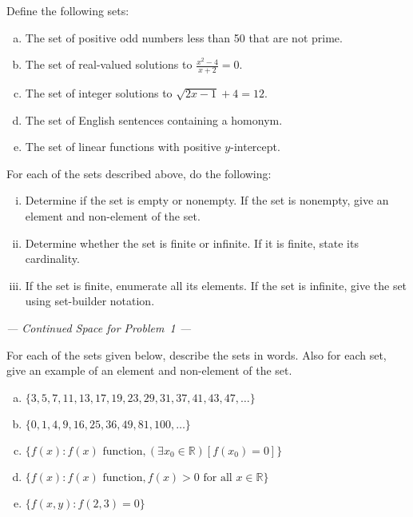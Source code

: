 \documentclass[11pt,letterpaper]{article}
\begin{document}

 Define the following sets:
        \begin{enumerate}[(a)]
        \item The set of positive odd numbers less than 50 that are not prime. 
        \item The set of real-valued solutions to $\frac{x^2 - 4}{x + 2}= 0$.
        \item The set of integer solutions to $\sqrt{2x - 1} + 4= 12$. 
        \item The set of English sentences containing a homonym. 
        \item The set of linear functions with positive $y$-intercept. 
        \end{enumerate}
For each of the sets described above, do the following:
	\begin{enumerate}[(i)]
	\item Determine if the set is empty or nonempty. If the set is nonempty, give an element and non-element of the set.	
	\item Determine whether the set is finite or infinite. If it is finite, state its cardinality. 
	\item If the set is finite, enumerate all its elements. If the set is infinite, give the set using set-builder notation. 
	\end{enumerate}



\newpage 
\begin{center} {\itshape --- Continued Space for Problem~1 ---} \end{center}
\newpage


 For each of the sets given below, describe the sets in words. Also for each set, give an example of an element and non-element of the set.
	\begin{enumerate}[(a)]
	\item $\{ 3, 5, 7, 11, 13, 17, 19, 23, 29, 31, 37, 41, 43, 47, \ldots \}$
	\item $\{ 0, 1, 4, 9, 16, 25, 36, 49, 81, 100, \ldots \}$
	\item $\{ f(x) \colon f(x) \text{ function}, ( \exists x_0 \in \mathbb{R} ) [f(x_0)= 0] \}$
	\item $\{ f(x) \colon f(x) \text{ function}, f(x) > 0 \text{ for all } x \in \mathbb{R} \}$
	\item $\{ f(x, y) \colon f(2, 3)= 0 \}$
	\end{enumerate}
\end{document}
